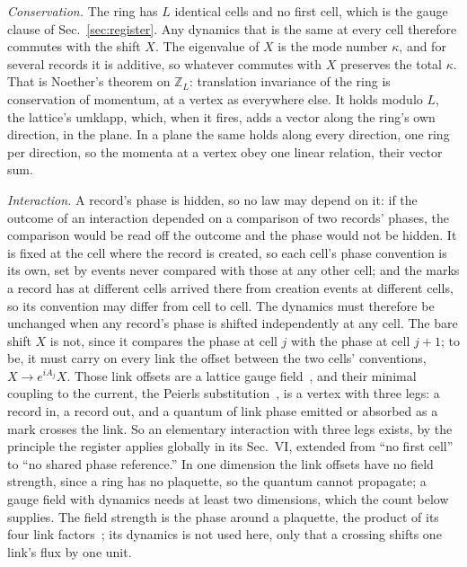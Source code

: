 \documentclass[aps,prd,twocolumn,superscriptaddress,nofootinbib]{revtex4-2}
\begin{document}
\textit{Conservation.} The ring has $L$ identical cells and no first cell, which is the gauge clause of Sec.~\ref{sec:register}. Any dynamics that is the same at every cell therefore commutes with the shift $X$. The eigenvalue of $X$ is the mode number $\kappa$, and for several records it is additive, so whatever commutes with $X$ preserves the total $\kappa$. That is Noether's theorem on $\mathbb{Z}_L$: translation invariance of the ring is conservation of momentum, at a vertex as everywhere else. It holds modulo $L$, the lattice's umklapp, which, when it fires, adds a vector along the ring's own direction, in the plane. In a plane the same holds along every direction, one ring per direction, so the momenta at a vertex obey one linear relation, their vector sum.

\textit{Interaction.} A record's phase is hidden, so no law may depend on it: if the outcome of an interaction depended on a comparison of two records' phases, the comparison would be read off the outcome and the phase would not be hidden. It is fixed at the cell where the record is created, so each cell's phase convention is its own, set by events never compared with those at any other cell; and the marks a record has at different cells arrived there from creation events at different cells, so its convention may differ from cell to cell. The dynamics must therefore be unchanged when any record's phase is shifted independently at any cell. The bare shift $X$ is not, since it compares the phase at cell $j$ with the phase at cell $j+1$; to be, it must carry on every link the offset between the two cells' conventions, $X \to e^{iA_j}X$. Those link offsets are a lattice gauge field~\cite{wilson1974}, and their minimal coupling to the current, the Peierls substitution~\cite{peierls1933}, is a vertex with three legs: a record in, a record out, and a quantum of link phase emitted or absorbed as a mark crosses the link. So an elementary interaction with three legs exists, by the principle the register applies globally in its Sec.~VI, extended from ``no first cell'' to ``no shared phase reference.'' In one dimension the link offsets have no field strength, since a ring has no plaquette, so the quantum cannot propagate; a gauge field with dynamics needs at least two dimensions, which the count below supplies. The field strength is the phase around a plaquette, the product of its four link factors~\cite{wilson1974}; its dynamics is not used here, only that a crossing shifts one link's flux by one unit.
\end{document}
